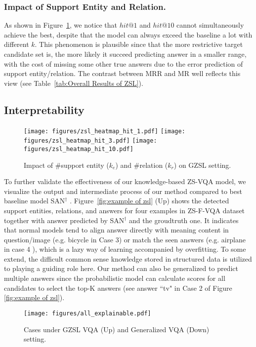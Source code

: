 \documentclass[runningheads]{llncs}
\begin{document}
\subsubsection{Impact of Support Entity and Relation.}\label{sec:Impact of fr}
As shown in Figure~\ref{fig:heatmap of k}, we notice that $hit@1$ and $hit@10$ cannot simultaneously achieve the best, despite that the model can always  exceed the baseline a lot with different $k$. This phenomenon is plausible since that the more restrictive target candidate set is, the more likely it succeed predicting answer in a smaller range, with the cost of missing some other true answers due to the error prediction of support entity/relation. The contrast between MRR and MR well reflects this view (see Table~\ref{tab:Overall Results of ZSL}).
\subsection{Interpretability}\label{sec:Interpretability}
\begin{figure}[htbp]
\centering
\texttt{[image: figures/zsl\_heatmap\_hit\_1.pdf]} 
\texttt{[image: figures/zsl\_heatmap\_hit\_3.pdf]}
\texttt{[image: figures/zsl\_heatmap\_hit\_10.pdf]}
\caption{Impact of \#support entity ($k_e$) and \#relation ($k_r$) on GZSL setting.}
\label{fig:heatmap of k}
\end{figure}
To further validate the effectiveness of our knowledge-based ZS-VQA model, we visualize the output and intermediate process of our method compared to best baseline model SAN$^\dag$ \cite{DBLP:conf/cvpr/HuCS18}.
Figure~\ref{fig:example of zsl} (Up) shows the detected support entities, relations, and answers for four examples in ZS-F-VQA dataset together with answer predicted by SAN$^\dag$ and the groudtruth one. 
It indicates that normal models tend to align answer directly with meaning content in question/image (e.g. bicycle in Case 3) or match the seen answers (e.g. airplane in case 4 ), which is a lazy way of learning accompanied by overfitting.  
To some extend, the difficult common sense knowledge stored in structured data is utilized to playing a guiding role here.
Our method can also be generalized to predict multiple answers since the probabilistic model can calculate scores for all candidates to select the top-K answers (see answer ``tv" in Case 2 of Figure \ref{fig:example of zsl}).
\begin{figure}[htbp]
\centering
\texttt{[image: figures/all\_explainable.pdf]} 
\caption{Cases under GZSL VQA (Up) and Generalized VQA (Down) setting. }
\label{fig:example of zsl}
\label{fig:example of general}
\end{figure}
\end{document}
